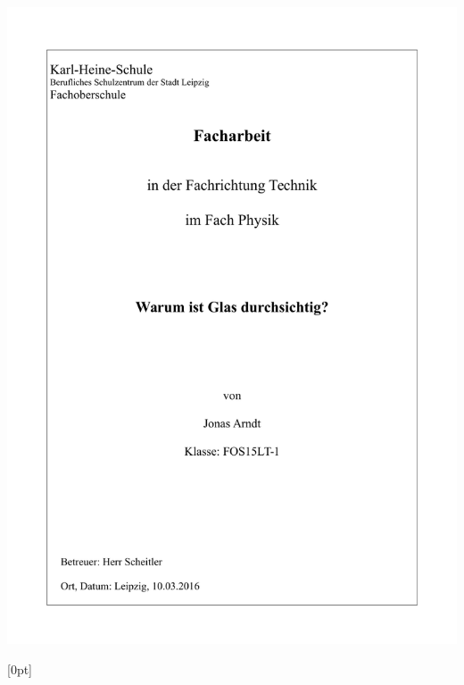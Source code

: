\documentclass[11pt,a4paper,oneside]{report}
\begin{document}
\pagestyle{empty}
\includegraphics[scale=0.75]{FacharbeitTittelblattT.pdf}

\newpage

\titlespacing{\chapter}{0em}{1em}{1.5em}[0pt]
\renewcommand{\contentsname}{Inhaltsverzeichnis}
\renewcommand{\bibname}{Quellen}
\setlength{\parindent}{0em}

\pagestyle{fancy}
\fancyhf{}
\fancyhead[CEO]{\thepage}
\renewcommand{\headrulewidth}{0pt}

\renewcommand{\cftdot}{}
\end{document}
